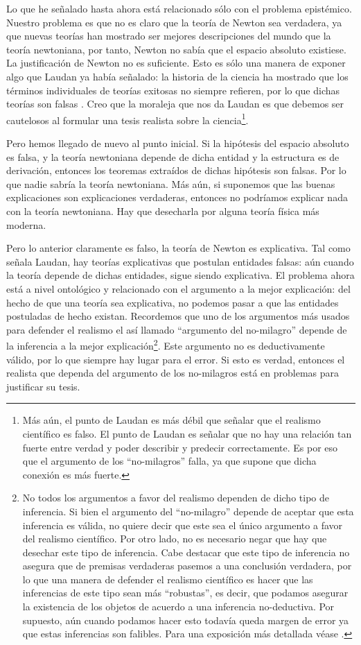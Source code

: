 Lo que he señalado hasta ahora está relacionado sólo con el problema epistémico. Nuestro problema es que no es claro que la teoría de Newton sea verdadera, ya que nuevas teorías han mostrado ser mejores descripciones del mundo que la teoría newtoniana, por tanto, Newton no sabía que el espacio absoluto existiese. La justificación de Newton no es suficiente. Esto es sólo una manera de exponer algo que Laudan ya había señalado: la historia de la ciencia ha mostrado que los términos individuales de teorías exitosas no siempre refieren, por lo que dichas teorías son falsas \cite{Laudan1981}. Creo que la moraleja que nos da Laudan es que debemos ser cautelosos al formular una tesis realista sobre la ciencia\footnote{Más aún, el punto de Laudan es más débil que señalar que el realismo científico es falso. El punto de Laudan es señalar que no hay una relación tan fuerte entre verdad y poder describir y predecir correctamente. Es por eso que el argumento de los ``no-milagros'' falla, ya que supone que dicha conexión es más fuerte.}.

Pero hemos llegado de nuevo al punto inicial. Si la hipótesis del espacio absoluto es falsa, y la teoría newtoniana depende de dicha entidad y la estructura es de derivación, entonces los teoremas extraídos de dichas hipótesis son falsas. Por lo que nadie sabría la teoría newtoniana. Más aún, si suponemos que las buenas explicaciones son explicaciones verdaderas, entonces no podríamos explicar nada con la teoría newtoniana. Hay que desecharla por alguna teoría física más moderna.

Pero lo anterior claramente es falso, la teoría de Newton es explicativa. Tal como señala Laudan, hay teorías explicativas que postulan entidades falsas: aún cuando la teoría depende de dichas entidades, sigue siendo explicativa. El problema ahora está a nivel ontológico y relacionado con el argumento a la mejor explicación: del hecho de que una teoría sea explicativa, no podemos pasar a que las entidades postuladas de hecho existan. Recordemos que uno de los argumentos más usados para defender el realismo el así llamado ``argumento del no-milagro'' depende de la inferencia a la mejor explicación\footnote{No todos los argumentos a favor del realismo dependen de dicho tipo de inferencia. Si bien el argumento del ``no-milagro'' depende de aceptar que esta inferencia es válida, no quiere decir que este sea el único argumento a favor del realismo científico. Por otro lado, no es necesario negar que hay que desechar este tipo de inferencia. Cabe destacar que este tipo de inferencia no asegura que de premisas verdaderas pasemos a una conclusión verdadera, por lo que una manera de defender el realismo científico es hacer que las inferencias de este tipo sean más ``robustas'', es decir, que podamos asegurar la existencia de los objetos de acuerdo a una inferencia no-deductiva. Por supuesto, aún cuando podamos hacer esto todavía queda margen de error ya que estas inferencias son falibles. Para una exposición más detallada véase \cite{Saatsi2010-SAAFVC-2}.}. Este argumento no es deductivamente válido, por lo que siempre hay lugar para el error. Si esto es verdad, entonces el realista que dependa del argumento de los no-milagros está en problemas para justificar su tesis.

